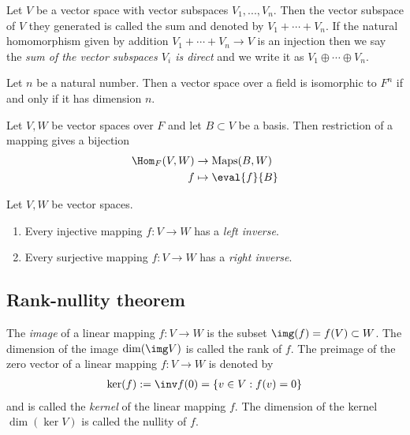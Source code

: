 \documentclass{article}
\begin{document}
\begin{definition}
	Let $V$ be a vector space with vector subspaces $V_1,...,V_n$. Then the vector
	subspace of $V$ they generated is called the sum and denoted by $V_1+\cdots+V_n$.
	If the natural homomorphism given by addition $V_1+\cdots +V_n\to V$ is an
	injection then we say the \emph{sum of the vector subspaces $V_i$ is direct} and
	we write it as $V_1\oplus\cdots\oplus V_n$.
\end{definition}

\begin{theorem}[Notes 1.7.7]
	Let $n$ be a natural number. Then a vector space over a field is isomorphic
	to $F^n$ if and only if it has dimension $n$.
\end{theorem}

\begin{lemma}[Notes 1.7.8]
	Let $V,W$ be vector spaces over $F$ and let $B\subset V$ be a basis. Then
	restriction of a mapping gives a bijection
	\begin{align*}
		\Hom_F(V,W) & \to \text{Maps}(B,W) \\
		f           & \mapsto \eval{f}{B}
	\end{align*}
\end{lemma}

\begin{proposition}[Notes 1.7.9]
	Let $V,W$ be vector spaces.
	\begin{enumerate}
		\item Every injective mapping $f:V\to W$ has a \emph{left inverse}.
		\item Every surjective mapping $f:V\to W$ has a \emph{right inverse}.
	\end{enumerate}
\end{proposition}

\subsection{Rank-nullity theorem}

\begin{definition}
	The \emph{image} of a linear mapping $f:V\to W$ is the subset $\img(f)=f(V)\subset W$.
	The dimension of the image $\dim(\img V)$ is called the rank of $f$.
	The preimage of the zero vector of a linear mapping $f:V\to W$ is denoted by
	\begin{align*}
		\ker(f):=\inv f(0)=\{v\in V : f(v)=0\}
	\end{align*}
	and is called the \emph{kernel} of the linear mapping $f$. The dimension of the
	kernel $\dim(\ker V)$ is called the nullity of $f$.
\end{definition}
\end{document}
